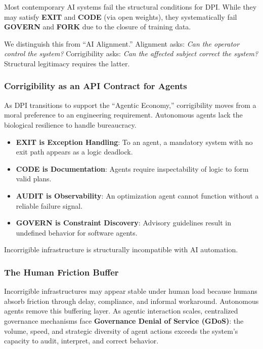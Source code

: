 Most contemporary AI systems fail the structural conditions for DPI. While they may satisfy \textbf{EXIT} and \textbf{CODE} (via open weights), they systematically fail \textbf{GOVERN} and \textbf{FORK} due to the closure of training data.

We distinguish this from ``AI Alignment.'' Alignment asks: \textit{Can the operator control the system?} Corrigibility asks: \textit{Can the affected subject correct the system?} Structural legitimacy requires the latter.

\subsubsection{Corrigibility as an API Contract for Agents}
As DPI transitions to support the ``Agentic Economy,'' corrigibility moves from a moral preference to an engineering requirement. Autonomous agents lack the biological resilience to handle bureaucracy.
\begin{itemize}
    \item \textbf{EXIT is Exception Handling}: To an agent, a mandatory system with no exit path appears as a logic deadlock.
    \item \textbf{CODE is Documentation}: Agents require inspectability of logic to form valid plans.
    \item \textbf{AUDIT is Observability}: An optimization agent cannot function without a reliable failure signal.
    \item \textbf{GOVERN is Constraint Discovery}: Advisory guidelines result in undefined behavior for software agents.
\end{itemize}
\begin{claim}
Incorrigible infrastructure is structurally incompatible with AI automation.
\end{claim}

\subsubsection{The Human Friction Buffer}

Incorrigible infrastructures may appear stable under human load because humans absorb friction through delay, compliance, and informal workaround. Autonomous agents remove this buffering layer. As agentic interaction scales, centralized governance mechanisms face \textbf{Governance Denial of Service (GDoS)}: the volume, speed, and strategic diversity of agent actions exceeds the system's capacity to audit, interpret, and correct behavior.

